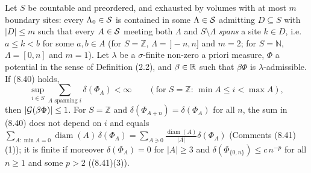 \begin{theorem}
    \label{thm:onedim-839}
    \leanok

    Let $S$ be countable and preordered, and exhausted by volumes with at most $m$ boundary
    sites: every $\Lambda_0 \in \mathcal{S}$ is contained in some $\Lambda \in \mathcal{S}$ admitting
    $D \subseteq S$ with $|D| \leq m$ such that every $A \in \mathcal{S}$ meeting both $\Lambda$ and
    $S \setminus \Lambda$ \emph{spans} a site $k \in D$, i.e.\ $a \leq k < b$ for some
    $a, b \in A$ (for $S = \mathbb{Z}$, $\Lambda = \,]-n,n]$ and $m = 2$; for $S = \mathbb{N}$,
    $\Lambda = [0,n]$ and $m = 1$). Let $\lambda$ be a $\sigma$-finite non-zero a priori
    measure, $\Phi$ a potential in
    the sense of Definition (2.2), and $\beta \in \mathbb{R}$ such that $\beta\Phi$ is
    $\lambda$-admissible. If (8.40) holds,
    \[\sup_{i \in S} \sum_{A \text{ spanning } i} \delta(\Phi_A) < \infty
      \qquad (\text{for } S = \mathbb{Z}\text{: } \min A \leq i < \max A),\]
    then $|\mathcal{G}(\beta\Phi)| \leq 1$. For $S = \mathbb{Z}$ and $\delta(\Phi_{A+n}) = \delta(\Phi_A)$
    for all $n$, the sum in (8.40) does not depend on $i$ and equals
    $\sum_{A : \min A = 0} \operatorname{diam}(A)\, \delta(\Phi_A)
      = \sum_{A \ni 0} \frac{\operatorname{diam}(A)}{|A|} \delta(\Phi_A)$ (Comments (8.41)(1)); it
    is finite if moreover $\delta(\Phi_A) = 0$ for $|A| \geq 3$ and
    $\delta(\Phi_{\{0,n\}}) \leq c\,n^{-p}$ for all $n \geq 1$ and some $p > 2$ ((8.41)(3)).
\end{theorem}
